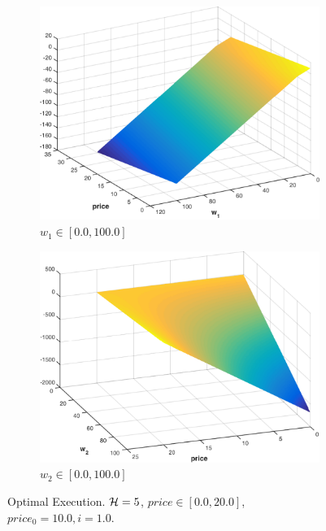 \begin{figure}[t!]
    \centering
    \begin{subfigure}[b]{0.4\textwidth}    
        \includegraphics[width=\linewidth, height=0.8\linewidth]{images/opt_execution_w1}
        \caption{$ w_1 \in \left[ 0.0, 100.0 \right]$}
        \label{fig:opt_execution_w1}
        \vspace{1em}
    \end{subfigure}
    
    \begin{subfigure}[b]{0.4\textwidth}    
        \includegraphics[width=\linewidth, height=0.8\linewidth]{images/opt_execution_w2}
        \caption{$ w_2 \in \left[ 0.0, 100.0 \right]$}
        \label{fig:pt_execution_w2}
    \end{subfigure}  
    \caption{Optimal Execution. $ \mathcal{H} = 5 $, $ price \in \left[ 0.0, 20.0 \right]$, $ price_0 = 10.0, i = 1.0$.}
    \label{fig:pt_execution}
\end{figure}
